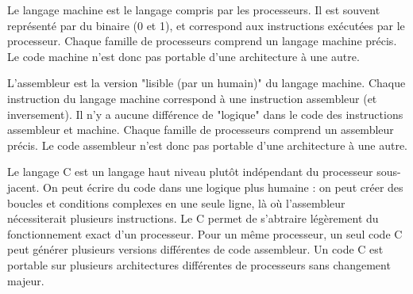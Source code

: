 \documentclass[11pt,a4paper]{article}
\begin{document}
\bigskip

\noindent Le langage machine est le langage compris par les processeurs.
Il est souvent représenté par du binaire (0 et 1), et correspond aux instructions exécutées par le processeur.
Chaque famille de processeurs comprend un langage machine précis.
Le code machine n'est donc pas portable d'une architecture à une autre.

\bigskip

\noindent L'assembleur est la version "lisible (par un humain)" du langage machine.
Chaque instruction du langage machine correspond à une instruction assembleur (et inversement).
Il n'y a aucune différence de "logique" dans le code des instructions assembleur et machine.
Chaque famille de processeurs comprend un assembleur précis.
Le code assembleur n'est donc pas portable d'une architecture à une autre.

\bigskip

\noindent Le langage C est un langage haut niveau plutôt indépendant du processeur sous-jacent.
On peut écrire du code dans une logique plus humaine : on peut créer des boucles et conditions complexes en une seule ligne, là où l'assembleur nécessiterait plusieurs instructions.
Le C permet de s'abtraire légèrement du fonctionnement exact d'un processeur.
Pour un même processeur, un seul code C peut générer plusieurs versions différentes de code assembleur.
Un code C est portable sur plusieurs architectures différentes de processeurs sans changement majeur.
\end{document}
